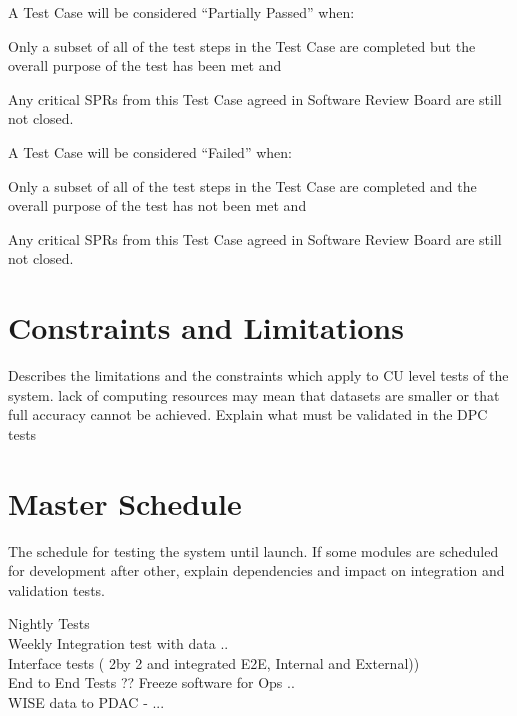 A Test Case will be considered ``Partially Passed'' when:
\begin{itemize_single}
\item Only a subset of all of the test steps in the Test Case are completed but the overall purpose of the test has been met and
\item Any critical SPRs from this Test Case agreed in Software Review Board are still not closed.
\end{itemize_single}

A Test Case will be considered ``Failed'' when:
\begin{itemize_single}
\item Only a subset of all of the test steps in the Test Case are completed and the overall purpose of the test has not been met and
\item Any critical SPRs from this Test Case agreed in Software Review Board are still not closed.
\end{itemize_single}

\section{Constraints and Limitations}

Describes the limitations and the constraints which apply to CU level tests of the system. lack of computing resources may mean that datasets are smaller or that full accuracy cannot be achieved. Explain what must be validated in the DPC tests

\section{Master Schedule}

The schedule for testing the system until launch. If some modules are scheduled for development after other, explain dependencies and impact on integration and validation tests.


Nightly Tests \\

Weekly Integration test with data .. \\

Interface tests ( 2by 2 and integrated E2E, Internal and External)) \\

End to End Tests ?? Freeze software for Ops .. \\

WISE data to PDAC - ...\\

